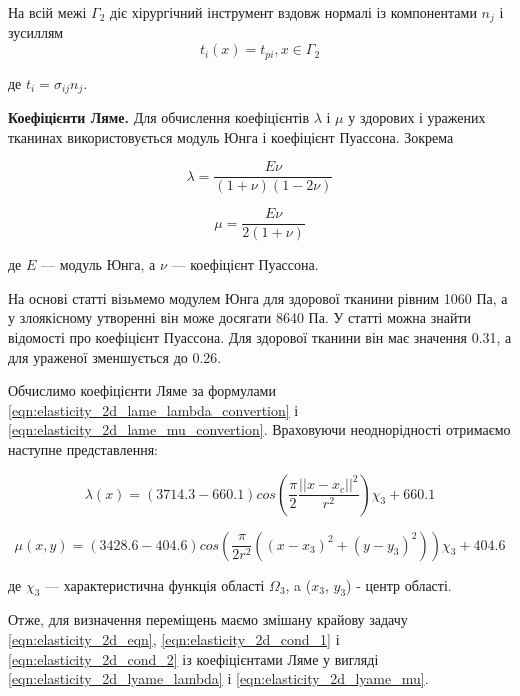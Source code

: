 \noindent На всій межі $\Gamma_2$ діє хірургічний інструмент вздовж нормалі із компонентами $n_j$ і зусиллям
\begin{equation}
    \label{eqn:elasticity_2d_cond_2}
    t_i(x) = t_{pi}, x \in \Gamma_2
\end{equation}

\noindent де $t_i = \sigma_{ij}n_j$.

\textbf{Коефіцієнти Ляме.} Для обчислення коефіцієнтів $\lambda$ і $\mu$ у здорових і уражених тканинах використовується
модуль Юнга і коефіцієнт Пуассона. Зокрема

\begin{equation}
    \label{eqn:elasticity_2d_lame_lambda_convertion}
    \lambda = \dfrac{E\nu}{(1+\nu)(1-2\nu)}
\end{equation}

\begin{equation}
    \label{eqn:elasticity_2d_lame_mu_convertion}
    \mu = \dfrac{E\nu}{2(1+\nu)}
\end{equation}

\noindent де $E$ --- модуль Юнга, а $\nu$ --- коефіцієнт Пуассона.  

На основі статті \cite{elast-young-modulus-cancer} візьмемо модулем Юнга для здорової тканини рівним 1060 Па, а у 
злоякісному утворенні він може досягати 8640 Па. У статті \cite{elast-poisson-rato-cancer} можна знайти відомості про 
коефіцієнт Пуассона. Для здорової тканини він має значення 0.31, а для ураженої зменшується до 0.26. 

Обчислимо коефіцієнти Ляме за формулами \ref{eqn:elasticity_2d_lame_lambda_convertion} і 
\ref{eqn:elasticity_2d_lame_mu_convertion}. Враховуючи неоднорідності отримаємо наступне представлення:

\begin{equation}
    \label{eqn:elasticity_2d_lyame_lambda}
    \lambda(x) = (3714.3 - 660.1)cos(\frac{\pi}{2}\frac{||x-x_c||^2}{r^2})\chi_3 + 660.1
\end{equation}

\begin{equation}
    \label{eqn:elasticity_2d_lyame_mu}
    \mu(x, y) = (3428.6 - 404.6)cos(\frac{\pi}{2r^2}((x - x_3)^2 + (y - y_3)^2))\chi_3 + 404.6
\end{equation}

\noindent де $\chi_3$ --- характеристична функція області $\Omega_3$, a ($x_3$, $y_3$) - центр області.

Отже, для визначення переміщень маємо змішану крайову задачу \ref{eqn:elasticity_2d_eqn}, \ref{eqn:elasticity_2d_cond_1} 
і \ref{eqn:elasticity_2d_cond_2} із коефіцієнтами Ляме у вигляді \ref{eqn:elasticity_2d_lyame_lambda} і 
\ref{eqn:elasticity_2d_lyame_mu}.

